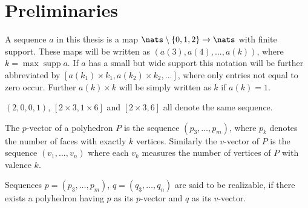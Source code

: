 \section{Preliminaries}

\begin{definition}[Sequence]
  A sequence $a$ in this thesis is a map $\nats \setminus \{0, 1, 2\} \rightarrow \nats$ with finite support. These maps will be written as $(a(3), a(4), ..., a(k))$, where $k = \operatorname{max} \operatorname{supp} a$. If $a$ has a small but wide support this notation will be further abbreviated by $[a(k_1) \times k_1, a(k_2) \times k_2, ...]$, where only entries not equal to zero occur. Further $a(k) \times k$ will be simply written as $k$ if $a(k) = 1$.
\end{definition}
\begin{example}
  $(2, 0, 0, 1)$, $[2 \times 3, 1 \times 6]$ and $[2 \times 3, 6]$ all denote the same sequence.
\end{example}
\begin{definition}\label{def:relizable}
  The $p$-vector of a polyhedron $P$ is the sequence $(p_3, \dots, p_m)$, where $p_k$ denotes the number of faces with exactly $k$ vertices. Similarly the $v$-vector of $P$ is the sequence $(v_1, \dots, v_n)$ where each $v_k$ measures the number of vertices of $P$ with valence $k$.
\end{definition}

\begin{definition}\label{def:realizable}
  Sequences $p = (p_3, \dots, p_m)$, $q = (q_3, \dots, q_n)$ are said to be realizable, if there exists a polyhedron having $p$ as its $p$-vector and $q$ as its $v$-vector.
\end{definition}

